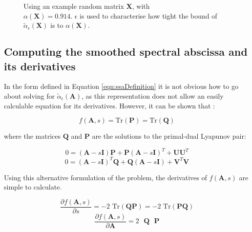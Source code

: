 \documentclass[12pt, a4paper]{article}
\begin{document}
\begin{SCfigure}
    \centering
    
    \caption{Using an example random matrix $\mathbf{X}$, with \\$\alpha(\mathbf{X}) = 0.914$.  $\epsilon$ is used to characterise how tight the bound of $\tilde{\alpha}_\epsilon(\mathbf{X})$ is to $\alpha(\mathbf{X})$.}
    \label{fig:SSA-SAvsEps}
\end{SCfigure}
    

\FloatBarrier
\subsection{Computing the smoothed spectral abscissa and its derivatives}
\label{sec:SSAcomputation}

In the form defined in Equation \ref{eqn:ssaDefinition} it is not obvious how to go about solving for $\tilde{\alpha}_\epsilon(\mathbf{A})$, as this representation does not allow an easily calculable equation for its derivatives.  However, it can be shown that \cite{Vanbiervliet2009}:

    \begin{equation}        f(\mathbf{A}, s) = \text{Tr}(\mathbf{P}) = \text{Tr}(\mathbf{Q})     \label{eqn:fAscalc}  \end{equation}

\noindent where the matrices $\mathbf{Q}$ and $\mathbf{P}$ are the solutions to the primal-dual Lyapunov pair:

    \begin{equation}        0 = (\mathbf{A} - s\mathbf{I})\mathbf{P} + \mathbf{P}(\mathbf{A} - s\mathbf{I})^T + \mathbf{UU}^T    \label{eqn:lyap1} \end{equation}
    \begin{equation}        0 = (\mathbf{A} - s\mathbf{I})^T\mathbf{Q} + \mathbf{Q}(\mathbf{A} - s\mathbf{I}) + \mathbf{V}^T\mathbf{V}  \label{eqn:lyap2} \end{equation}
    
Using this alternative formulation of the problem, the derivatives of $f(\mathbf{A}, s)$ are simple to calculate. 

    \begin{equation}        \frac{\partial f(\mathbf{A},s)}{\partial s} = -2\text{ Tr}(\mathbf{QP}) = -2\text{ Tr}(\mathbf{PQ})   \label{eqn:dfds} \end{equation}
    \begin{equation}        \frac{\partial f(\mathbf{A},s)}{\partial \mathbf{A}} = 2\text{ } \mathbf{Q}\text{ } \mathbf{P}                         \end{equation}
\end{document}
